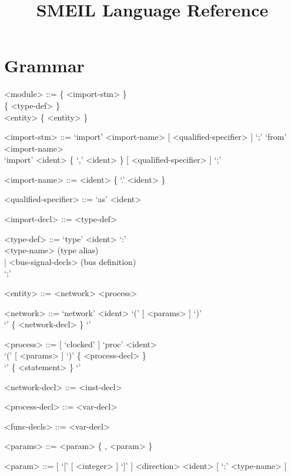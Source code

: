 \documentclass{article}
\title{SMEIL Language Reference}
\date{}
\begin{document}
\maketitle

\section*{Grammar}
\begin{grammar}
  <module> ::= \{ <import-stm> \} \\ \{ <type-def> \} \\ <entity> \{ <entity> \}

  <import-stm> ::= `import' <import-name> [ <qualified-specifier> ] `;'
  \alt `from' <import-name> \\ `import' <ident> \{ `,' <ident> \} [ <qualified-specifier> ]
  `;'

  <import-name> ::= <ident> \{ `.' <ident> \}

  <qualified-specifier> ::= `as' <ident>

  <import-decl> ::= <type-def>

  <type-def> ::= `type' <ident> `:' \\
    <type-name> (type alias) \\
    | <bus-signal-decls> (bus definition)\\
    `;' 

  <entity> ::= <network>
  \alt <process>

  <network> ::= `network' <ident> `(' [ <params> ] `)' \\`{' \{ <network-decl> \} `}'

  <process> ::= [ `clocked' ] `proc' <ident> \\ `(' [
             <params> ] `)' \{ <process-decl> \}\\ `{' \{ <statement> \} `}'

  <network-decl> ::= <inst-decl>

  <process-decl> ::= <var-decl>

  <func-decls> ::= <var-decl>
  
  <params> ::= <param> \{ , <param> \}

  <param> ::= [ `[' [ <integer> ] `]' ] <direction> <ident> [ `:' <type-name> ]


\end{grammar}
\end{document}
